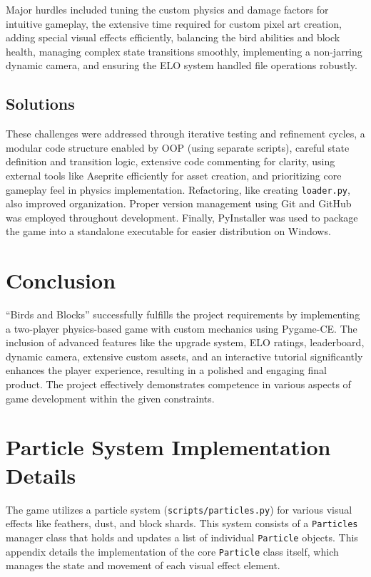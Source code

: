 \documentclass[11pt, a4paper]{article}
\begin{document}
Major hurdles included tuning the custom physics and damage factors for intuitive gameplay, the extensive time required for custom pixel art creation, adding special visual effects efficiently, balancing the bird abilities and block health, managing complex state transitions smoothly, implementing a non-jarring dynamic camera, and ensuring the ELO system handled file operations robustly.

\subsection{Solutions}

These challenges were addressed through iterative testing and refinement cycles, a modular code structure enabled by OOP (using separate scripts), careful state definition and transition logic, extensive code commenting for clarity, using external tools like Aseprite efficiently for asset creation, and prioritizing core gameplay feel in physics implementation. Refactoring, like creating \texttt{loader.py}, also improved organization. Proper version management using Git and GitHub was employed throughout development. Finally, PyInstaller was used to package the game into a standalone executable for easier distribution on Windows.


\section{Conclusion}

\enquote{Birds and Blocks} successfully fulfills the project requirements by implementing a two-player physics-based game with custom mechanics using Pygame-CE. The inclusion of advanced features like the upgrade system, ELO ratings, leaderboard, dynamic camera, extensive custom assets, and an interactive tutorial significantly enhances the player experience, resulting in a polished and engaging final product. The project effectively demonstrates competence in various aspects of game development within the given constraints.

\newpage

\appendix

\section{Particle System Implementation Details}
\label{app:particles}

The game utilizes a particle system (\texttt{scripts/particles.py}) for various visual effects like feathers, dust, and block shards. This system consists of a \texttt{Particles} manager class that holds and updates a list of individual \texttt{Particle} objects. This appendix details the implementation of the core \texttt{Particle} class itself, which manages the state and movement of each visual effect element.
\end{document}
